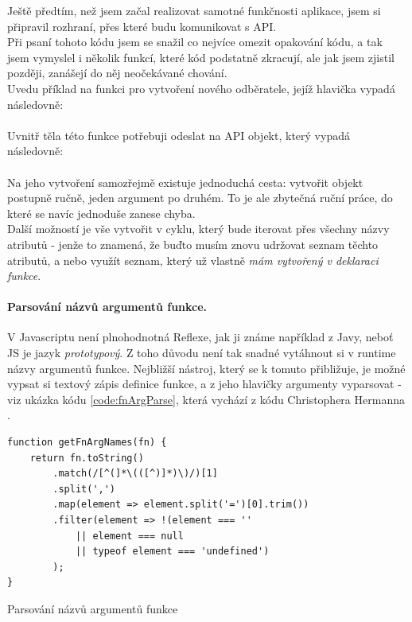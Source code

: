 Ještě předtím, než jsem začal realizovat samotné funkčnosti aplikace, jsem si připravil rozhraní, přes které budu komunikovat s API.\\
Při psaní tohoto kódu jsem se snažil co nejvíce omezit opakování kódu, a tak jsem vymyslel i několik funkcí, které kód podstatně zkracují, ale jak jsem zjistil později, zanášejí do něj neočekávané chování.\\
Uvedu příklad na funkci pro vytvoření nového odběratele, jejíž hlavička vypadá následovně:\\
\\
Uvnitř těla této funkce potřebuji odeslat na API objekt, který vypadá následovně:\\
\\
Na jeho vytvoření samozřejmě existuje jednoduchá cesta: vytvořit objekt postupně ručně, jeden argument po druhém. To je ale zbytečná ruční práce, do které se navíc jednoduše zanese chyba.\\
Další možností je vše vytvořit v cyklu, který bude iterovat přes všechny názvy atributů - jenže to znamená, že buďto musím znovu udržovat seznam těchto atributů, a nebo využít seznam, který už vlastně \emph{mám vytvořený v deklaraci funkce}.\\

\paragraph{Parsování názvů argumentů funkce.} V Javascriptu není plnohodnotná Reflexe, jak ji známe například z Javy, neboť JS je jazyk \emph{prototypový}. Z toho důvodu není tak snadné vytáhnout si v runtime názvy argumentů funkce. Nejbližší nástroj, který se k tomuto přibližuje, je možné vypsat si textový zápis definice funkce, a z jeho hlavičky argumenty vyparsovat - viz ukázka kódu \ref{code:fnArgParse}, která vychází z kódu Christophera Hermanna \cite{fn-parse}.

\begin{listing}[h]
\begin{verbatim}
function getFnArgNames(fn) {
    return fn.toString()
        .match(/[^(]*\(([^)]*)\)/)[1]
        .split(',')
        .map(element => element.split('=')[0].trim())
        .filter(element => !(element === '' 
            || element === null 
            || typeof element === 'undefined')
        );
}
\end{verbatim}
\caption{Parsování názvů argumentů funkce} \label{code:fnArgParse}
\end{listing}

